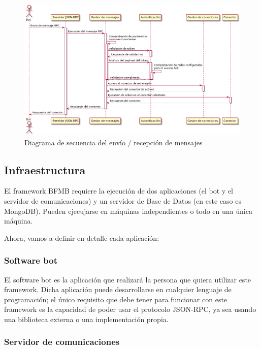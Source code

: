 \documentclass[spanish,12pt, a4paper, twoside]{paper}
\begin{document}
\begin{figure}[h]
\centering
	\includegraphics[width=\textwidth]{recursos/sequence}
\caption{Diagrama de secuencia del envío / recepción de mensajes}
\label{fig:DSecuencia envío recepción órdenes}
\end{figure}

\subsection{Infraestructura}

El framework BFMB requiere la ejecución de dos aplicaciones (el bot y el servidor de comunicaciones) y un servidor de Base de Datos (en este caso es MongoDB). Pueden ejecujarse en máquinas independientes o todo en una única máquina.
\newline

Ahora, vamos a definir en detalle cada aplicación:

\subsubsection{Software bot}

El software bot es la aplicación que realizará la persona que quiera utilizar este framework. Dicha aplicación puede desarrollarse en cualquier lenguaje de programación; el único requisito que debe tener para funcionar con este framework es la capacidad de poder usar el protocolo JSON-RPC, ya sea usando una biblioteca externa o una implementación propia.

\subsubsection{Servidor de comunicaciones}
\end{document}

